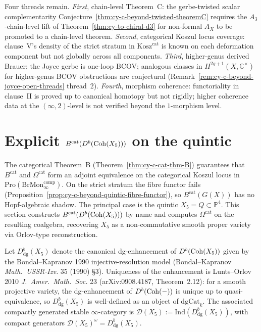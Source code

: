 \begin{remark}
\label{rem:phi-3-cat-master-open-threads}
Four threads remain. \emph{First}, chain-level Theorem~C: the
gerbe-twisted scalar complementarity
Conjecture~\ref{thm:cy-c-beyond-twisted-theoremC} requires the
$A_3$-chain-level lift of Theorem~\ref{thm:cy-to-chiral-d3} for
non-formal $A_X$ to be promoted to a chain-level theorem.
\emph{Second}, categorical Koszul locus coverage: clause~V's density
of the strict stratum in $\mathrm{Kosz}^{\mathrm{cat}}$ is known on
each deformation component but not globally across all components.
\emph{Third}, higher-genus derived Brauer: the Joyce gerbe is one-loop
BCOV; analogous classes in $H^{2g+1}(X, \mathbb C^\times)$ for
higher-genus BCOV obstructions are conjectural
(Remark~\ref{rem:cy-c-beyond-joyce-open-threads} thread~2).
\emph{Fourth}, morphism coherence: functoriality in clause~II is
proved up to canonical homotopy but not rigidly; higher coherence
data at the $(\infty,2)$-level is not verified beyond the $1$-morphism
level.
\end{remark}

\section{Explicit \texorpdfstring{$B^{\mathrm{cat}}(D^b(\mathrm{Coh}(X_5)))$}{B-cat(D-b(Coh(X-5)))} on the quintic}
\label{sec:cy-c-beyond-quintic-bcat-explicit}

The categorical Theorem~B (Theorem~\ref{thm:cy-c-cat-thm-B}) guarantees
that $B^{\mathrm{cat}}$ and $\Omega^{\mathrm{cat}}$ form an adjoint
equivalence on the categorical Koszul locus in
$\mathrm{Pro}(\mathrm{BrMon}^{\mathrm{comp}}_\infty)$. On the strict
stratum the fibre functor fails
(Proposition~\ref{prop:cy-c-beyond-quintic-fibre-functor}), so
$B^{\mathrm{cat}}(G(X))$ has no Hopf-algebraic shadow. The principal
case is the quintic $X_5 = Q \subset \mathbb P^4$. This section
constructs $B^{\mathrm{cat}}(D^b(\mathrm{Coh}(X_5)))$ by name and computes
$\Omega^{\mathrm{cat}}$ on the resulting coalgebra, recovering $X_5$ as
a non-commutative smooth proper variety via Orlov-type reconstruction.

\begin{definition}
\label{def:cy-c-quintic-dg-enhancement}
Let $D^b_{\mathrm{dg}}(X_5)$ denote the canonical dg-enhancement of
$D^b(\mathrm{Coh}(X_5))$ given by the Bondal--Kapranov 1990 injective-resolution
model (Bondal--Kapranov \emph{Math.\ USSR-Izv.} 35 (1990) \S 3).
Uniqueness of the enhancement is Lunts--Orlov 2010
\emph{J.\ Amer.\ Math.\ Soc.} 23 (arXiv:0908.4187, Theorem~2.12): for a
smooth projective variety, the dg-enhancement of $D^b(\mathrm{Coh}(-))$ is
unique up to quasi-equivalence, so $D^b_{\mathrm{dg}}(X_5)$ is
well-defined as an object of $\mathrm{dgCat}_k$. The associated
compactly generated stable $\infty$-category is
$\mathcal D(X_5) := \mathrm{Ind}(D^b_{\mathrm{dg}}(X_5))$, with
compact generators $\mathcal D(X_5)^{\omega} = D^b_{\mathrm{dg}}(X_5)$.
\end{definition}

